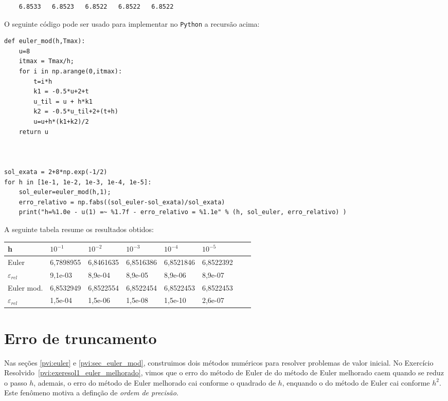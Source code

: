 \begin{resol}
\begin{verbatim}
    6.8533   6.8523   6.8522   6.8522   6.8522
\end{verbatim}
\fi


\ifispython
O seguinte código pode ser usado para implementar no \verb+Python+ a recursão acima:

\begin{verbatim}
def euler_mod(h,Tmax):
	u=8
  	itmax = Tmax/h;
	for i in np.arange(0,itmax):
		t=i*h
		k1 = -0.5*u+2+t
		u_til = u + h*k1
		k2 = -0.5*u_til+2+(t+h)
		u=u+h*(k1+k2)/2
	return u

	

sol_exata = 2+8*np.exp(-1/2)
for h in [1e-1, 1e-2, 1e-3, 1e-4, 1e-5]:
	sol_euler=euler_mod(h,1);
	erro_relativo = np.fabs((sol_euler-sol_exata)/sol_exata)
	print("h=%1.0e - u(1) =~ %1.7f - erro_relativo = %1.1e" % (h, sol_euler, erro_relativo) )

\end{verbatim}
\fi
A seguinte tabela resume os resultados obtidos:
\begin{center}
 \begin{tabular}{|l|l|l|l|l|l|l|l|}%
\hline
   h&$10^{-1}$&$10^{-2}$&$10^{-3}$&$10^{-4}$&$10^{-5}$\\
   \hline
   Euler & 6,7898955 &  6,8461635  &  6,8516386  &  6,8521846  &  6,8522392  \\
   \hline
   $\varepsilon_{rel}$ &9,1e-03 &  8,9e-04  & 8,9e-05&   8,9e-06 &  8,9e-07\\
   \hline
   \hline
  Euler mod. & 6,8532949 &  6,8522554  &  6,8522454  &  6,8522453  &  6,8522453 \\
   \hline
   $\varepsilon_{rel}$ &1,5e-04 &  1,5e-06  & 1,5e-08&   1,5e-10 &  2,6e-07\\
   \hline
 
   \end{tabular}
\end{center}
\end{resol}


\section{Erro de truncamento}
Nas seções \ref{pvi:euler} e \ref{pvi:sec_euler_mod}, construimos dois métodos numéricos para resolver problemas de valor inicial. No Exercício Resolvido~\ref{pvi:exeresol1_euler_melhorado}, vimos que o erro do método de Euler de do método de Euler melhorado caem quando se reduz o passo $h$, ademais, o erro do método de Euler melhorado cai conforme o quadrado de $h$, enquando o do método de Euler cai conforme $h^2$. Este fenômeno motiva a definção de \emph{ordem de precisão}.


